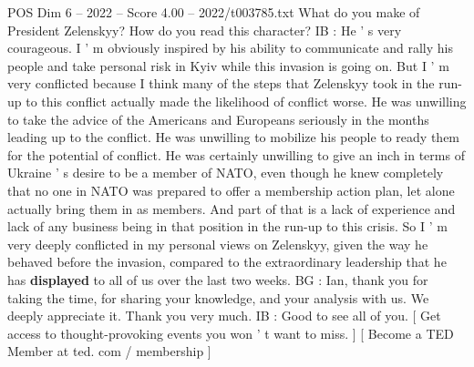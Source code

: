 \begin{textsample}{POS Dim 6 – 2022 – Score 4.00 – 2022/t003785.txt}
What do you make of President Zelenskyy?
How do you read this character?
IB : He ' s very courageous.
I ' m obviously inspired by his ability to communicate and rally his people and take personal risk in Kyiv while this invasion is going on.
But I ' m very conflicted because I think many of the steps that Zelenskyy took in the run-up to this conflict actually made the likelihood of conflict worse.
He was unwilling to take the advice of the Americans and Europeans seriously in the months leading up to the conflict.
He was unwilling to mobilize his people to ready them for the potential of conflict.
He was certainly unwilling to give an inch in terms of Ukraine ' s desire to be a member of NATO, even though he knew completely that no one in NATO was prepared to offer a membership action plan, let alone actually bring them in as members.
And part of that is a lack of experience and lack of any business being in that position in the run-up to this crisis.
So I ' m very deeply conflicted in my personal views on Zelenskyy, given the way he behaved before the invasion, compared to the extraordinary leadership that he has \textbf{displayed} to all of us over the last two weeks.
BG : Ian, thank you for taking the time, for sharing your knowledge, and your analysis with us.
We deeply appreciate it.
Thank you very much.
IB : Good to see all of you. [ Get access to thought-provoking events you won ' t want to miss. ] [ Become a TED Member at ted. com / membership ]

\end{textsample}
